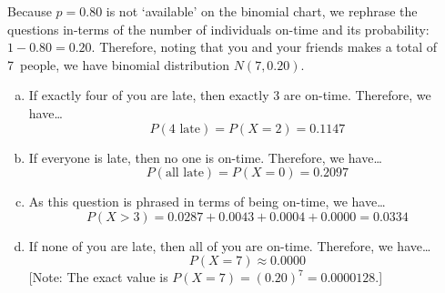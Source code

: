 \documentclass[11pt,letterpaper]{article}
\begin{document}
\sol Because $p= 0.80$ is not `available' on the binomial chart, we rephrase the questions in-terms of the number of individuals on-time and its probability: $1 - 0.80= 0.20$. Therefore, noting that you and your friends makes a total of 7~people, we have binomial distribution $N(7, 0.20)$. 

\begin{enumerate}[(a)]
\item If exactly four of you are late, then exactly 3 are on-time. Therefore, we have\dots
	\[
	P(4 \text{ late})= P(X= 2)= 0.1147
	\] \pspace

\item If everyone is late, then no one is on-time. Therefore, we have\dots
	\[
	P(\text{all late})= P(X= 0)= 0.2097
	\] \pspace

\item As this question is phrased in terms of being on-time, we have\dots
	\[
	P(X > 3)= 0.0287 + 0.0043 + 0.0004 + 0.0000= 0.0334
	\] \pspace

\item If none of you are late, then all of you are on-time. Therefore, we have\dots 
	\[
	P(X= 7) \approx 0.0000
	\]
[Note: The exact value is $P(X= 7)= (0.20)^7= 0.0000128$.]
\end{enumerate}
\end{document}
